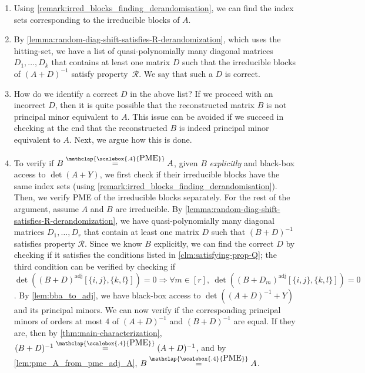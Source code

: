 \documentclass[11pt,letterpaper]{article}
\DeclareMathOperator{\ad}{adj}
\newcommand{\adj}[1]{(#1)^{\ad}}
\newcommand{\PME}{\stackrel{\mathclap{\scalebox{.4}{\mbox{PME}}}}{=}}
\newcommand{\prop}{\mathcal{R}}
\begin{document}
{{{\begin{enumerate}
    \item Using \cref{remark:irred_blocks_finding_derandomisation}, we can find the index sets corresponding to the irreducible blocks of $A$. 
    \item By \cref{lemma:random-diag-shift-satisfies-R-derandomization}, which uses the \cite{GT20} hitting-set, we have a list of quasi-polynomially many diagonal matrices $D_1,\dots,D_k$ that contains at least one matrix $D$ such that the irreducible blocks of $(A+D)^{-1}$ satisfy property~$\prop$. We say that such a $D$ is correct.
    \item How do we identify a correct $D$ in the above list? If we proceed with an incorrect $D$, then it is quite possible that the reconstructed matrix $B$ is not principal minor equivalent to $A$. This issue can be avoided if we succeed in checking at the end that the reconstructed $B$ is indeed principal minor equivalent to $A$. Next, we argue how this is done. %
    
    
    \item To verify if $B\PME A$, given $B$ \emph{explicitly} and black-box access to $\det(A+Y)$, we first check if their irreducible blocks have the same index sets (using \cref{remark:irred_blocks_finding_derandomisation}). Then, we verify PME of the irreducible blocks separately. For the rest of the argument, assume $A$ and $B$ are irreducible. By \cref{lemma:random-diag-shift-satisfies-R-derandomization}, we have quasi-polynomially many diagonal matrices $D_1,\dots,D_r$ that contain at least one matrix $D$ such that $(B+D)^{-1}$ satisfies property $\prop$. Since we know $B$ explicitly, we can find the correct $D$ by checking if it satisfies the conditions listed in \cref{clm:satisfying-prop-Q}; the third condition can be verified by checking if $\det\left(\adj{B+D}[\{i,j\}, \{k,l\}]\right)=0 \Longrightarrow \forall m\in[r], \ \det\left(\adj{B+D_m}[\{i,j\},\{k,l\}]\right)=0$. By \cref{lem:bba_to_adj}, we have black-box access to $\det((A+D)^{-1} + Y)$ and its principal minors. We can now verify if the corresponding principal minors of orders at most $4$ of $(A+D)^{-1}$ and $(B+D)^{-1}$ are equal. If they are, then by \cref{thm:main-characterization}, $(B+D)^{-1} \PME (A+D)^{-1}$, and by \cref{lem:pme_A_from_pme_adj_A}, $B \PME A$.
\end{enumerate}
}}}
\end{document}
